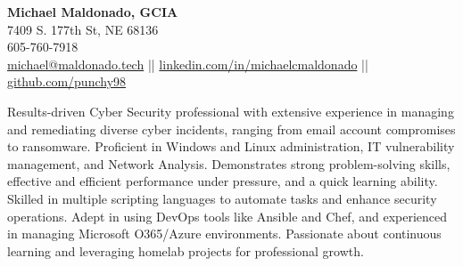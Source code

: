 \documentclass[a4paper,10pt]{article}
\begin{document}
\begin{center}
    \textbf{\LARGE Michael Maldonado, GCIA } \\
    7409 S. 177th St, NE 68136 \\
    605-760-7918 \\
    \href{mailto:michael@maldonado.tech}{michael@maldonado.tech} ||
    \href{https://linkedin.com/in/michaelcmaldonado}{linkedin.com/in/michaelcmaldonado} ||
    \href{https://github.com/punchy98}{github.com/punchy98} 
\end{center}

Results-driven Cyber Security professional with extensive experience in managing and remediating diverse cyber incidents, ranging from email account compromises to ransomware. Proficient in Windows and Linux administration, IT vulnerability management, and Network Analysis. Demonstrates strong problem-solving skills, effective and efficient performance under pressure, and a quick learning ability. Skilled in multiple scripting languages to automate tasks and enhance security operations. Adept in using DevOps tools like Ansible and Chef, and experienced in managing Microsoft O365/Azure environments. Passionate about continuous learning and leveraging homelab projects for professional growth.
\end{document}
